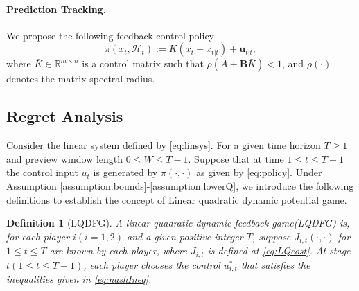 \documentclass[letterpaper, 10 pt, conference]{ieeeconf}  %
\newtheorem{definition}{Definition}
\begin{document}
\paragraph{Prediction Tracking. } We propose the following feedback control policy
\begin{equation}\label{eq:policy}
    \pi(x_{t},\mathcal{H}_{t}) := \bar{K}(x_{t}-x_{t|t}) + \mathbf{u}_{t|t},
\end{equation}
where $\bar{K}\in \mathbb{R}^{m\times n}$ is a control matrix such that $\rho(A+\mathbf{B}\bar{K}) < 1$, and $\rho(\cdot)$ denotes the matrix spectral radius.


\subsection{Regret Analysis}
Consider the linear system defined by \eqref{eq:linsys}. For a given time horizon $T \geq 1$ and preview window length $0 \leq W \leq T-1$. Suppose that at time $1\leq t \leq T-1$ the control input $u_{t}$ is generated by $\pi(\cdot,\cdot)$ as given by \eqref{eq:policy}. Under Assumption \ref{assumption:bounds}-\ref{assumption:lowerQ}, we introduce the following definitions to establish the concept of Linear quadratic dynamic potential game.
\begin{definition}[LQDFG]\label{def:LQDFG}
    A linear quadratic dynamic feedback game(LQDFG) is, for each player $i(i = 1,2)$ and a given positive integer $T$, suppose $J_{i,t}(\cdot,\cdot)$ for $1\leq t\leq T$ are known by each player, where $J_{i,t}$ is defined at \eqref{eq:LQcost}. At stage $t(1\leq t\leq T-1)$, each player chooses the control $u_{i,t}^{*}$ that satisfies the inequalities given in \eqref{eq:nashIneq}. 
\end{definition}

\end{document}
